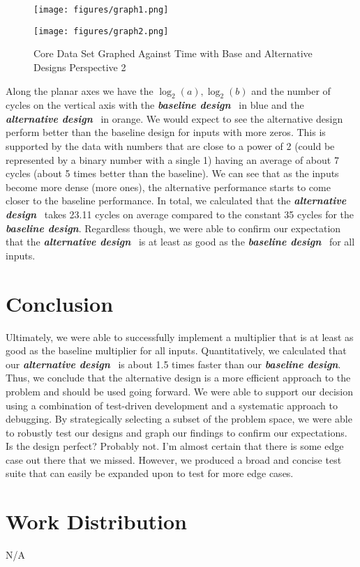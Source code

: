 \documentclass[10pt]{article}
\newcommand{\baseline}[0]{\textit{\textbf{baseline design}}}
\newcommand{\alternative}[0]{\textit{\textbf{alternative design}}}
\begin{document}
	\begin{figure}[!ht]
		\centering
		\begin{minipage}{0.5\textwidth}
			\centering
			\texttt{[image: figures/graph1.png]}
			\caption{Core Data Set Graphed Against Time with Base and Alternative Designs Perspective 1}
			\label{fig:graph1}
		\end{minipage}\hfill
		\begin{minipage}{0.5\textwidth}
			\centering
			\texttt{[image: figures/graph2.png]} 
			\caption{Core Data Set Graphed Against Time with Base and Alternative Designs Perspective 2}
			\label{fig:graph2}
		\end{minipage}
	\end{figure}

	Along the planar axes we have the $\log_2(a),\log_2(b)$ and the number of cycles on the vertical axis with the \baseline~ in blue and the \alternative~ in orange. We would expect to see the alternative design perform better than the baseline design for inputs with more zeros. This is supported by the data with numbers that are close to a power of 2 (could be represented by a binary number with a single 1) having an average of about 7 cycles (about 5 times better than the baseline). We can see that as the inputs become more dense (more ones), the alternative performance starts to come closer to the baseline performance. In total, we calculated that the \alternative~ takes 23.11 cycles on average compared to the constant 35 cycles for the \baseline. Regardless though, we were able to confirm our expectation that the \alternative~ is at least as good as the \baseline~ for all inputs.	
	\section{Conclusion}
	\label{sec:conclusion}

	Ultimately, we were able to successfully implement a multiplier that is at least as good as the baseline multiplier for all inputs. Quantitatively, we calculated that our \alternative~ is about 1.5 times faster than our \baseline. Thus, we conclude that the alternative design is a more efficient approach to the problem and should be used going forward. We were able to support our decision using a combination of test-driven development and a systematic approach to debugging. By strategically selecting a subset of the problem space, we were able to robustly test our designs and graph our findings to confirm our expectations. Is the design perfect? Probably not. I'm almost certain that there is some edge case out there that we missed. However, we produced a broad and concise test suite that can easily be expanded upon to test for more edge cases. 

	\section{Work Distribution}
	\label{sec:work_distribution}

	N/A
	
    
	
	
\end{document}
